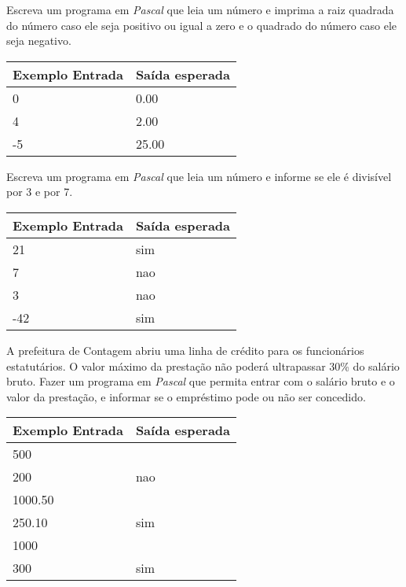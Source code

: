 \item Escreva um programa em \emph{Pascal} que leia um número e imprima a 
raiz quadrada do número caso ele seja positivo ou igual a zero e o quadrado 
do número caso ele seja negativo.

\begin{center}
\begin{tabular}{|l|l|} \hline
Exemplo Entrada & Saída esperada \\ \hline
0                & 0.00               \\ \hline
4                & 2.00               \\ \hline
-5               & 25.00               \\ \hline
\end{tabular}
\end{center}

\item Escreva um programa em \emph{Pascal} que leia um número e informe se ele 
é divisível por 3 e por 7.

\begin{center}
\begin{tabular}{|l|l|} \hline
Exemplo Entrada & Saída esperada \\ \hline
21               & sim               \\ \hline
7                & nao               \\ \hline
3                & nao               \\ \hline
-42              & sim               \\ \hline
\end{tabular}
\end{center}

\item A prefeitura de Contagem abriu uma linha de crédito para os funcionários 
estatutários. O valor máximo da prestação não poderá ultrapassar 30\% do 
salário bruto. Fazer um programa em \emph{Pascal} que permita entrar com o 
salário bruto e o valor da prestação, e informar se o empréstimo pode ou não 
ser concedido.

\begin{center}
\begin{tabular}{|l|l|} \hline
Exemplo Entrada & Saída esperada \\ \hline
500                &                \\
200                & nao               \\ \hline
1000.50                &                \\
250.10                & sim               \\ \hline
1000                &                \\
300                & sim               \\ \hline
\end{tabular}
\end{center}

